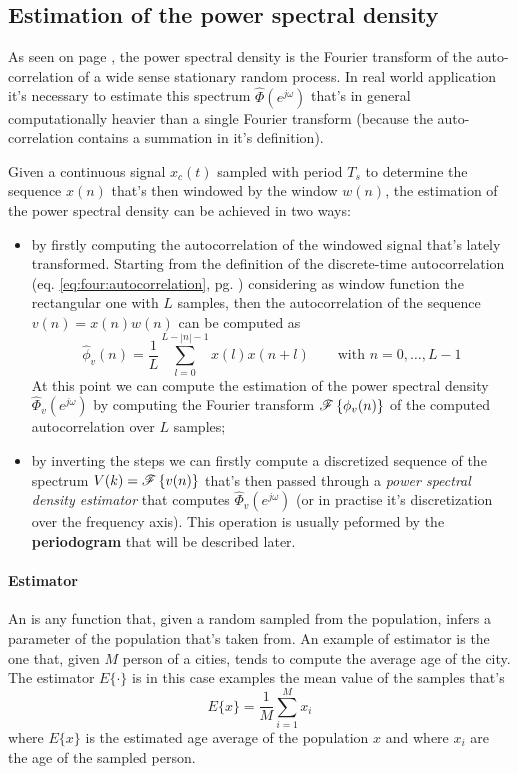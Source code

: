 \subsection{Estimation of the power spectral density}
	As seen on page \pageref{eq:prob:psd}, the power spectral density is the Fourier transform of the auto-correlation of a wide sense stationary random process. In real world application it's necessary to estimate this spectrum $\hat \Phi(e^{j\omega})$ that's in general computationally heavier than a single Fourier transform (because the auto-correlation contains a summation in it's definition).
	
	Given a continuous signal $x_c(t)$ sampled with period $T_s$ to determine the sequence $x(n)$ that's then windowed by the window $w(n)$, the estimation of the power spectral density can be achieved in two ways:
	\begin{itemize}
		\item by firstly computing the autocorrelation of the windowed signal that's lately transformed. Starting from the definition of the discrete-time autocorrelation (eq. \ref{eq:four:autocorrelation}, pg. \pageref{eq:four:autocorrelation}) considering as window function the rectangular one with $L$ samples, then the autocorrelation of the sequence $v(n) = x(n)w(n)$ can be computed as
		\begin{equation} \label{eq:dft:windowedauto}
			\hat \phi_v(n) = \frac 1 L \sum_{l=0}^{L-|n|-1} x(l) x(n+l) \qquad \textrm{with } n = 0,\dots,L-1
		\end{equation}
		At this point we can compute the estimation of the power spectral density $\hat \Phi_v(e^{j\omega})$ by computing the Fourier transform $\mathscr{F}\left\{ \phi_v(n) \right\}$ of the computed autocorrelation over $L$ samples;
		
		\item by inverting the steps we can firstly compute a discretized sequence of the spectrum $V(k) = \mathscr{F}\left\{ v(n) \right\}$ that's then passed through a \textit{power spectral density estimator} that computes $\hat \Phi_v(e^{j\omega})$ (or in practise it's discretization over the frequency axis). This operation is usually peformed by the \textbf{periodogram} that will be described later.
	\end{itemize}
	
	\paragraph{Estimator} An  is any function that, given a random sampled from the population, infers a parameter of the population that's taken from. An example of estimator is the one that, given $M$ person of a cities, tends to compute the average age of the city. The estimator $E\{\cdot\}$ is in this case examples the mean value of the samples that's
	\[ E\{x\} = \frac 1 M \sum_{i=1}^M x_i \]
	where $E\{x\}$ is the estimated age average of the population $x$ and where $x_i$ are the age of the sampled person. \vspace{3mm}
	
